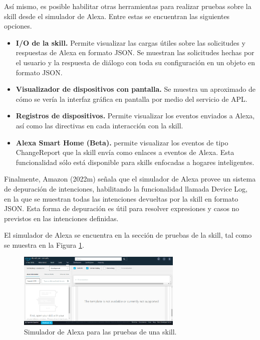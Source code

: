 Así mismo, es posible habilitar otras herramientas para realizar pruebas sobre la skill desde el simulador de Alexa. Entre estas se encuentran las siguientes opciones.

\begin{itemize}
  \item \textbf{I/O de la skill.} Permite visualizar las cargas útiles sobre las solicitudes y respuestas de Alexa en formato JSON. Se muestran las solicitudes hechas por el usuario y la respuesta de diálogo con toda su configuración en un objeto en formato JSON.
  \item \textbf{Visualizador de dispositivos con pantalla.} Se muestra un aproximado de cómo se vería la interfaz gráfica en pantalla por medio del servicio de APL.
  \item \textbf{Registros de dispositivos.} Permite visualizar los eventos enviados a Alexa, así como las directivas en cada interacción con la skill.
  \item \textbf{Alexa Smart Home (Beta).} permite visualizar los eventos de tipo ChangeReport que la skill envía como enlaces a eventos de Alexa. Esta funcionalidad sólo está disponible para skills enfocadas a hogares inteligentes.
\end{itemize}

Finalmente, Amazon (2022m) señala que el simulador de Alexa provee un sistema de depuración de intenciones, habilitando la funcionalidad llamada Device Log, en la que se muestran todas las intenciones devueltas por la skill en formato JSON. Esta forma de depuración es útil para resolver expresiones y casos no previstos en las intenciones definidas.

El simulador de Alexa se encuentra en la sección de pruebas de la skill, tal como se muestra en la Figura \ref{fig:412}.

\begin{figure}[H]
  \centering
  \includegraphics[width=0.70\textwidth]{Cap4/Figuras/Simulador.png}
  \caption{Simulador de Alexa para las pruebas de una skill.}
  \label{fig:412}
\end{figure}

